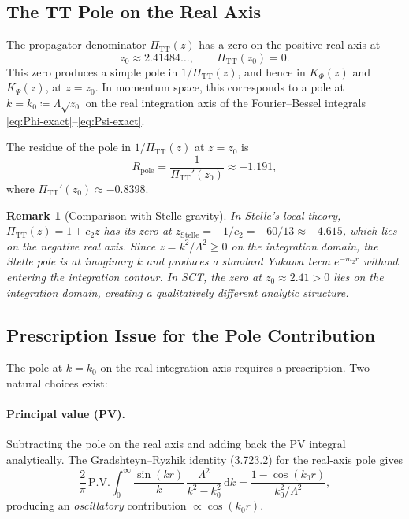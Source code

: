 \documentclass[11pt,a4paper]{article}
\newcommand{\dd}{\mathrm{d}}
\newcommand{\PiTT}{\Pi_{\mathrm{TT}}}
\newcommand{\KPhi}{K_\Phi}
\newcommand{\KPsi}{K_\Psi}
\newtheorem{remark}[theorem]{Remark}
\begin{document}
\subsection{The TT Pole on the Real Axis}
\label{sec:tt-pole}

The propagator denominator $\PiTT(z)$ has a zero on the positive real
axis at
\begin{equation}\label{eq:z0}
  z_0 \approx 2.41484\ldots,
  \qquad
  \PiTT(z_0) = 0.
\end{equation}
This zero produces a simple pole in $1/\PiTT(z)$, and hence in $\KPhi(z)$
and $\KPsi(z)$, at $z = z_0$.  In momentum space, this corresponds to a
pole at $k = k_0 \coloneqq \Lambda\sqrt{z_0}$ on the real integration axis
of the Fourier--Bessel integrals \eqref{eq:Phi-exact}--\eqref{eq:Psi-exact}.

The residue of the pole in $1/\PiTT(z)$ at $z = z_0$ is
\begin{equation}\label{eq:residue}
  R_{\mathrm{pole}} = \frac{1}{\PiTT'(z_0)}
  \approx -1.191,
\end{equation}
where $\PiTT'(z_0) \approx -0.8398$.

\begin{remark}[Comparison with Stelle gravity]
In Stelle's local theory, $\PiTT(z) = 1 + c_2 z$ has its zero at
$z_{\mathrm{Stelle}} = -1/c_2 = -60/13 \approx -4.615$, which lies on the
\emph{negative} real axis. Since $z = k^2/\Lambda^2 \geq 0$ on the
integration domain, the Stelle pole is at imaginary $k$ and produces a
standard Yukawa term $e^{-m_2 r}$ without entering the integration contour.
In SCT, the zero at $z_0 \approx 2.41 > 0$ lies on the integration domain,
creating a qualitatively different analytic structure.
\end{remark}

\subsection{Prescription Issue for the Pole Contribution}
\label{sec:prescription}

The pole at $k = k_0$ on the real integration axis requires a prescription.
Two natural choices exist:

\paragraph{Principal value (PV).}
Subtracting the pole on the real axis and adding back the PV integral
analytically.  The Gradshteyn--Ryzhik identity (3.723.2) for the
real-axis pole gives
\begin{equation}\label{eq:pv}
  \frac{2}{\pi}\,\mathrm{P.V.}\!\int_0^\infty
  \frac{\sin(kr)}{k}\,\frac{\Lambda^2}{k^2 - k_0^2}\,\dd k
  = \frac{1 - \cos(k_0 r)}{k_0^2/\Lambda^2},
\end{equation}
producing an \emph{oscillatory} contribution $\propto \cos(k_0 r)$.
\end{document}
